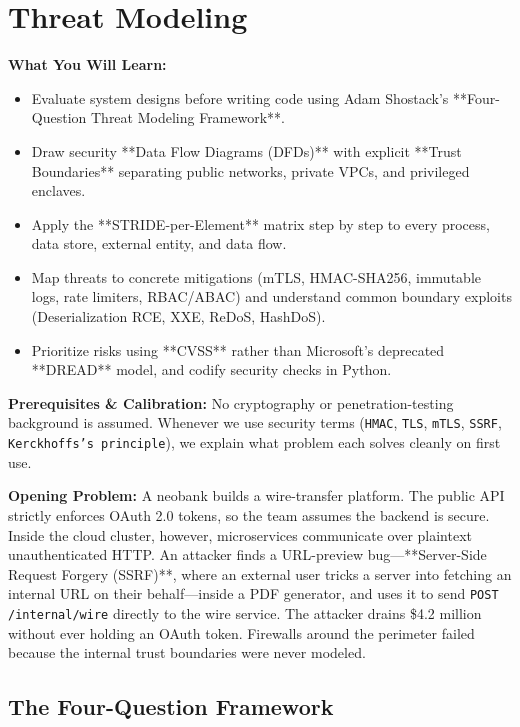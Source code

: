 \chapter{Threat Modeling}
\label{chap:threat-modeling}

\begin{chaptergoalsbox}
\textbf{What You Will Learn:}
\begin{itemize}[leftmargin=12pt]
  \item Evaluate system designs before writing code using Adam Shostack's **Four-Question Threat Modeling Framework**.
  \item Draw security **Data Flow Diagrams (DFDs)** with explicit **Trust Boundaries** separating public networks, private VPCs, and privileged enclaves.
  \item Apply the **STRIDE-per-Element** matrix step by step to every process, data store, external entity, and data flow.
  \item Map threats to concrete mitigations (mTLS, HMAC-SHA256, immutable logs, rate limiters, RBAC/ABAC) and understand common boundary exploits (Deserialization RCE, XXE, ReDoS, HashDoS).
  \item Prioritize risks using **CVSS** rather than Microsoft's deprecated **DREAD** model, and codify security checks in Python.
\end{itemize}

\textbf{Prerequisites \& Calibration:}
No cryptography or penetration-testing background is assumed. Whenever we use security terms (\texttt{HMAC}, \texttt{TLS}, \texttt{mTLS}, \texttt{SSRF}, \texttt{Kerckhoffs's principle}), we explain what problem each solves cleanly on first use.

\textbf{Opening Problem:}
A neobank builds a wire-transfer platform. The public API strictly enforces OAuth 2.0 tokens, so the team assumes the backend is secure. Inside the cloud cluster, however, microservices communicate over plaintext unauthenticated HTTP. An attacker finds a URL-preview bug---**Server-Side Request Forgery (SSRF)**, where an external user tricks a server into fetching an internal URL on their behalf---inside a PDF generator, and uses it to send \texttt{POST /internal/wire} directly to the wire service. The attacker drains \$4.2 million without ever holding an OAuth token. Firewalls around the perimeter failed because the internal trust boundaries were never modeled.
\end{chaptergoalsbox}

\section{The Four-Question Framework}

